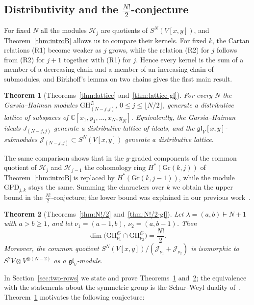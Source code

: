 \documentclass[11pt]{amsart}
\numberwithin{equation}{section}
\newtheorem{introthm}{Theorem}
\theoremstyle{definition}
\newcommand{\gl}{\mathfrak{gl}}
\newcommand{\GPD}{\mathrm{GPD}}         %
\newcommand{\GH}{\mathrm{GH}}         %
\newcommand{\Gr}{\mathrm{Gr}}
\newcommand{\cJ}{\mathcal{J}}
\begin{document}
	\subsection{Distributivity and the \texorpdfstring{$\frac{N!}{2}$}{N!/2}-conjecture}
	
	For fixed $N$ all the modules $\mathcal H_j$ are quotients of $S^N(V[x,y])$, and Theorem~\ref{thm:introB} allows us to compare their kernels. For fixed $k$, the Cartan relations (R1) become weaker as $j$ grows, while the relation (R2) for $j$ follows from (R2) for $j+1$ together with (R1) for $j$. Hence every kernel is the sum of a member of a decreasing chain and a member of an increasing chain of submodules, and Birkhoff's lemma on two chains gives the first main result.
	
	\begin{introthm}[Theorems~\ref{thm:lattice} and~\ref{thm:lattice-gl}]\label{thm:introC}
		For every $N$ the Garsia--Haiman modules $\GH^{\mathfrak S}_{(N-j,j)}$, $0\le j\le\lfloor N/2\rfloor$, generate a distributive lattice of subspaces of $\mathbb C[x_1,y_1,\dots,x_N,y_N]$. Equivalently, the Garsia--Haiman ideals $J_{(N-j,j)}$ generate a distributive lattice of ideals, and the $\gl_V[x,y]$-submodules $\cJ_{(N-j,j)}\subset S^N(V[x,y])$ generate a distributive lattice.
	\end{introthm}
	
	The same comparison shows that in the $y$-graded components of the common quotient of $\mathcal H_j$ and $\mathcal H_{j-1}$ the cohomology ring $H^*(\Gr(k,j))$ of Theorem~\ref{thm:introB} is replaced by $H^*(\Gr(k,j-1))$, while the module $\GPD_{j,k}$ stays the same. Summing the characters over $k$ we obtain the upper bound in the $\frac{N!}2$-conjecture; the lower bound was explained in our previous work~\cite{KM}.
	
	\begin{introthm}[Theorems~\ref{thm:N!/2} and~\ref{thm:N!/2-gl}]\label{thm:introD}
		Let $\lambda=(a,b)\vdash N+1$ with $a>b\ge1$, and let $\nu_1=(a-1,b)$, $\nu_2=(a,b-1)$. Then
		\[
		\dim\big(\GH^{\mathfrak S}_{\nu_1}\cap\GH^{\mathfrak S}_{\nu_2}\big)=\frac{N!}{2}.
		\]
		Moreover, the common quotient $S^N(V[x,y])/(\cJ_{\nu_1}+\cJ_{\nu_2})$ is isomorphic to $S^2V\otimes V^{\otimes(N-2)}$ as a $\gl_V$-module.
	\end{introthm}
	
	In Section~\ref{sec:two-rows} we state and prove Theorems~\ref{thm:introC} and~\ref{thm:introD}; the equivalence with the statements about the symmetric group is the Schur--Weyl duality of~\cite[\S3.3]{KM}.
	Theorem~\ref{thm:introC} motivates the following conjecture:
	
\end{document}
